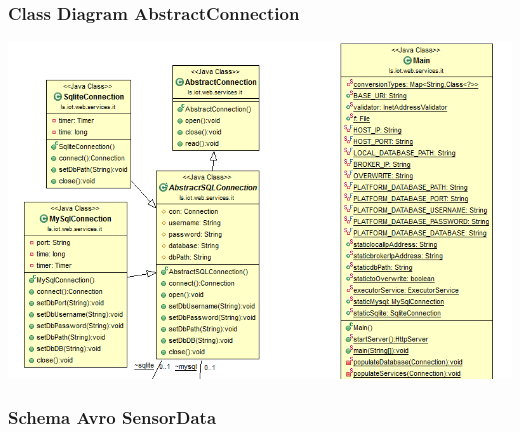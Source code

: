 \documentclass{beamer}
\begin{document}
\begin{frame}
\frametitle{Class Diagram AbstractConnection}
\includegraphics[width=1\textwidth]{images/main.png}
\end{frame}

\begin{frame}
\frametitle{Schema Avro SensorData}
\begin{figure}%
	\centering
	\qquad
\end{figure}
\end{frame}
\end{document}
